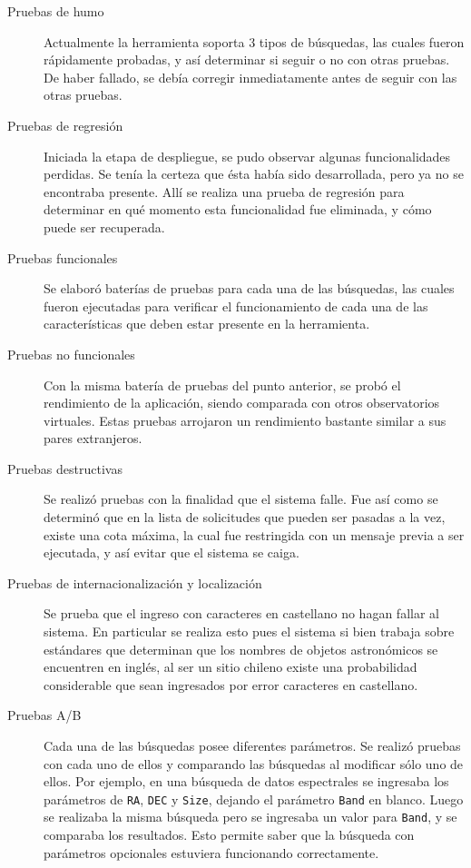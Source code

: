 \begin{description}
\begin{description}
\begin{description}
					\item[Pruebas de humo] Actualmente la herramienta soporta 3 tipos de búsquedas, las cuales fueron rápidamente probadas, y así determinar si seguir o no con otras pruebas. De haber fallado, se debía corregir inmediatamente antes de seguir con las otras pruebas.
					\item[Pruebas de regresión] Iniciada la etapa de despliegue, se pudo observar algunas funcionalidades perdidas. Se tenía la certeza que \'esta había sido desarrollada, pero ya no se encontraba presente. Allí se realiza una prueba de regresión para determinar en qu\'e momento esta funcionalidad fue eliminada, y cómo puede ser recuperada.
					\item[Pruebas funcionales] Se elaboró baterías de pruebas para cada una de las búsquedas, las cuales fueron ejecutadas para verificar el funcionamiento de cada una de las características que deben estar presente en la herramienta.
					\item[Pruebas no funcionales] Con la misma batería de pruebas del punto anterior, se probó el rendimiento de la aplicación, siendo comparada con otros observatorios virtuales. Estas pruebas arrojaron un rendimiento bastante similar a sus pares extranjeros.
					\item[Pruebas destructivas] Se realizó pruebas con la finalidad que el sistema falle. Fue así como se determinó que en la lista de solicitudes que pueden ser pasadas a la vez, existe una cota máxima, la cual fue restringida con un mensaje previa a ser ejecutada, y así evitar que el sistema se caiga.
					\item[Pruebas de internacionalización y localización] Se prueba que el ingreso con caracteres en castellano no hagan fallar al sistema. En particular se realiza esto pues el sistema si bien trabaja sobre estándares que determinan que los nombres de objetos astronómicos se encuentren en ingl\'es, al ser un sitio chileno existe una probabilidad considerable que sean ingresados por error caracteres en castellano.
					\item[Pruebas A/B] Cada una de las búsquedas posee diferentes parámetros. Se realizó pruebas con cada uno de ellos y comparando las búsquedas al modificar sólo uno de ellos. Por ejemplo, en una búsqueda de datos espectrales se ingresaba los parámetros de \verb;RA;, \verb;DEC; y \verb;Size;, dejando el parámetro \verb;Band; en blanco. Luego se realizaba la misma búsqueda pero se ingresaba un valor para \verb;Band;, y se comparaba los resultados. Esto permite saber que la búsqueda con parámetros opcionales estuviera funcionando correctamente.

\end{description}
\end{description}
\end{description}
